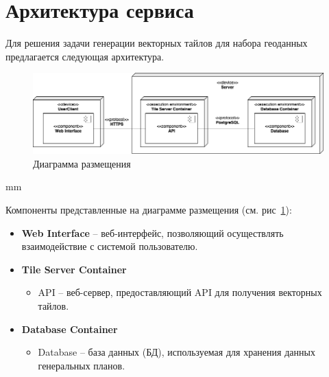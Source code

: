 \section*{\large{Архитектура сервиса}}

Для решения задачи генерации векторных тайлов
для набора геоданных предлагается следующая архитектура.

\begin{figure}[H]
	\hspace*{-1 cm}\includegraphics[width=\textwidth, left]{images/architecture/1}
	\caption{Диаграмма размещения}
	\label{pic:architecture__deployment-diagram}
\end{figure}
 mm

\noindent Компоненты представленные на диаграмме размещения (см. рис\ \ref{pic:architecture__deployment-diagram}):
\begin{itemize}
	\item \textbf{Web Interface} -- веб-интерфейс, позволяющий осуществлять взаимодействие с системой пользователю.
	\item \textbf{Tile Server Container}
	\begin{itemize}
		\item API -- веб-сервер, предоставляющий API для получения векторных тайлов.
	\end{itemize}
	\item \textbf{Database Container}
	\begin{itemize}
		\item Database -- база данных (БД), используемая для хранения данных генеральных планов.
	\end{itemize}
\end{itemize}

